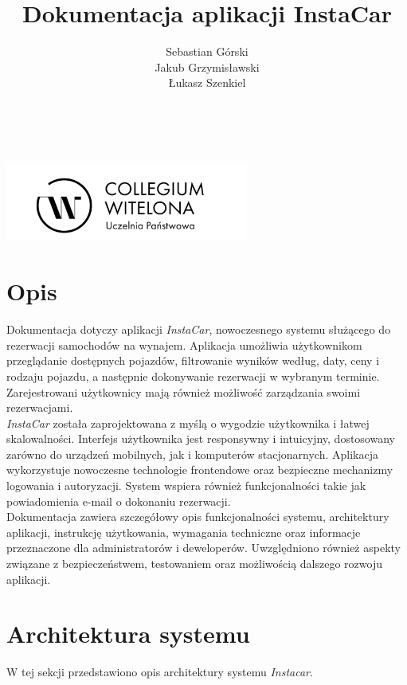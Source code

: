 \documentclass[12pt]{article}
\title{Dokumentacja aplikacji InstaCar}
\author{Sebastian Górski\\ Jakub Grzymisławski\\ Łukasz Szenkiel}
\date{}
\begin{document}
	
	\maketitle
	\thispagestyle{empty} 
	
	\begin{center}
		\vspace{10em}
		\includegraphics[width=0.6\textwidth]{CWUPlogo.png} \\[10em]
	\end{center}
	
	\newpage
	\tableofcontents
	
	\newpage
\section*{Opis}

Dokumentacja dotyczy aplikacji \textit{InstaCar}, nowoczesnego systemu służącego do rezerwacji samochodów na wynajem. Aplikacja umożliwia użytkownikom przeglądanie dostępnych pojazdów, filtrowanie wyników według, daty, ceny i rodzaju pojazdu, a następnie dokonywanie rezerwacji w wybranym terminie. Zarejestrowani użytkownicy mają również możliwość zarządzania swoimi rezerwacjami.\\
\textit{InstaCar} została zaprojektowana z myślą o wygodzie użytkownika i łatwej skalowalności. Interfejs użytkownika jest responsywny i intuicyjny, dostosowany zarówno do urządzeń mobilnych, jak i komputerów stacjonarnych. Aplikacja wykorzystuje nowoczesne technologie frontendowe oraz bezpieczne mechanizmy logowania i autoryzacji. System wspiera również funkcjonalności takie jak powiadomienia e-mail o dokonaniu rezerwacji.\\
Dokumentacja zawiera szczegółowy opis funkcjonalności systemu, architektury aplikacji, instrukcję użytkowania, wymagania techniczne oraz informacje przeznaczone dla administratorów i deweloperów. Uwzględniono również aspekty związane z bezpieczeństwem, testowaniem oraz możliwością dalszego rozwoju aplikacji.

	
\newpage
\section{Architektura systemu}
W tej sekcji przedstawiono opis architektury systemu \textit{Instacar}.
	
\end{document}
